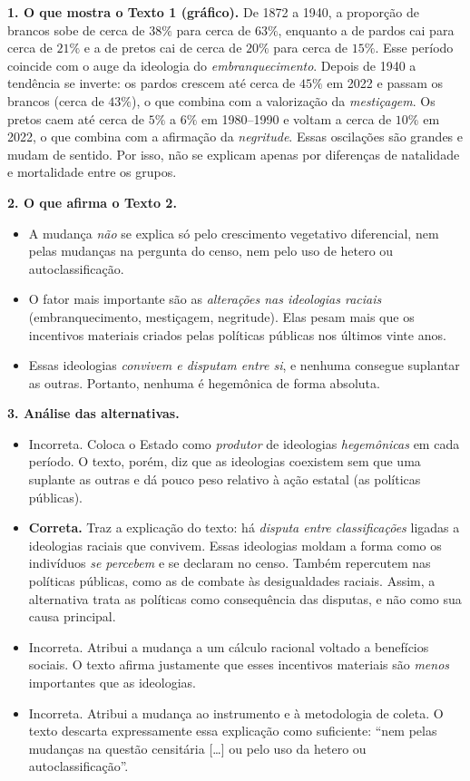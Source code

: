 \documentclass{article}%
\begin{document}
\textbf{1. O que mostra o Texto 1 (gráfico).} De 1872 a 1940, a proporção de brancos sobe de cerca de $38\%$ para cerca de $63\%$, enquanto a de pardos cai para cerca de $21\%$ e a de pretos cai de cerca de $20\%$ para cerca de $15\%$. Esse período coincide com o auge da ideologia do \emph{embranquecimento}. Depois de 1940 a tendência se inverte: os pardos crescem até cerca de $45\%$ em 2022 e passam os brancos (cerca de $43\%$), o que combina com a valorização da \emph{mestiçagem}. Os pretos caem até cerca de $5\%$ a $6\%$ em 1980--1990 e voltam a cerca de $10\%$ em 2022, o que combina com a afirmação da \emph{negritude}. Essas oscilações são grandes e mudam de sentido. Por isso, não se explicam apenas por diferenças de natalidade e mortalidade entre os grupos.

\textbf{2. O que afirma o Texto 2.}
\begin{itemize}
  \item A mudança \emph{não} se explica só pelo crescimento vegetativo diferencial, nem pelas mudanças na pergunta do censo, nem pelo uso de hetero ou autoclassificação.
  \item O fator mais importante são as \emph{alterações nas ideologias raciais} (embranquecimento, mestiçagem, negritude). Elas pesam mais que os incentivos materiais criados pelas políticas públicas nos últimos vinte anos.
  \item Essas ideologias \emph{convivem e disputam entre si}, e nenhuma consegue suplantar as outras. Portanto, nenhuma é hegemônica de forma absoluta.
\end{itemize}

\textbf{3. Análise das alternativas.}
\begin{itemize}
  \item[(a)] Incorreta. Coloca o Estado como \emph{produtor} de ideologias \emph{hegemônicas} em cada período. O texto, porém, diz que as ideologias coexistem sem que uma suplante as outras e dá pouco peso relativo à ação estatal (as políticas públicas).
  \item[(b)] \textbf{Correta.} Traz a explicação do texto: há \emph{disputa entre classificações} ligadas a ideologias raciais que convivem. Essas ideologias moldam a forma como os indivíduos \emph{se percebem} e se declaram no censo. Também repercutem nas políticas públicas, como as de combate às desigualdades raciais. Assim, a alternativa trata as políticas como consequência das disputas, e não como sua causa principal.
  \item[(c)] Incorreta. Atribui a mudança a um cálculo racional voltado a benefícios sociais. O texto afirma justamente que esses incentivos materiais são \emph{menos} importantes que as ideologias.
  \item[(d)] Incorreta. Atribui a mudança ao instrumento e à metodologia de coleta. O texto descarta expressamente essa explicação como suficiente: ``nem pelas mudanças na questão censitária [\dots] ou pelo uso da hetero ou autoclassificação''.
\end{itemize}
\end{document}

